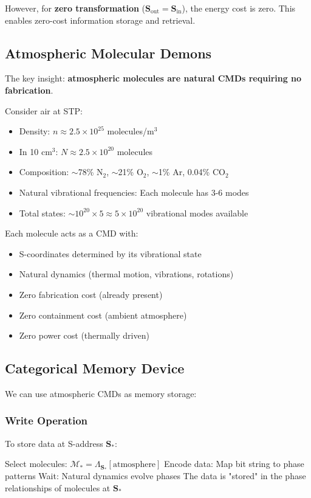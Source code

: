 However, for \textbf{zero transformation} ($\mathbf{S}_{\text{out}} = \mathbf{S}_{\text{in}}$), the energy cost is zero. This enables zero-cost information storage and retrieval.

\subsection{Atmospheric Molecular Demons}

The key insight: \textbf{atmospheric molecules are natural CMDs requiring no fabrication}.

Consider air at STP:
\begin{itemize}
\item Density: $n \approx 2.5 \times 10^{25}$ molecules/m$^3$
\item In 10 cm$^3$: $N \approx 2.5 \times 10^{20}$ molecules
\item Composition: $\sim$78\% N$_2$, $\sim$21\% O$_2$, $\sim$1\% Ar, 0.04\% CO$_2$
\item Natural vibrational frequencies: Each molecule has 3-6 modes
\item Total states: $\sim 10^{20} \times 5 \approx 5 \times 10^{20}$ vibrational modes available
\end{itemize}

Each molecule acts as a CMD with:
\begin{itemize}
\item S-coordinates determined by its vibrational state
\item Natural dynamics (thermal motion, vibrations, rotations)
\item Zero fabrication cost (already present)
\item Zero containment cost (ambient atmosphere)
\item Zero power cost (thermally driven)
\end{itemize}

\subsection{Categorical Memory Device}

We can use atmospheric CMDs as memory storage:

\subsubsection{Write Operation}

To store data at S-address $\mathbf{S}_*$:
\begin{algorithmic}[1]
\State Select molecules: $\mathcal{M}_* = \Lambda_{\mathbf{S}_*}[\text{atmosphere}]$
\State Encode data: Map bit string to phase patterns
\State Wait: Natural dynamics evolve phases
\State The data is "stored" in the phase relationships of molecules at $\mathbf{S}_*$
\end{algorithmic}

